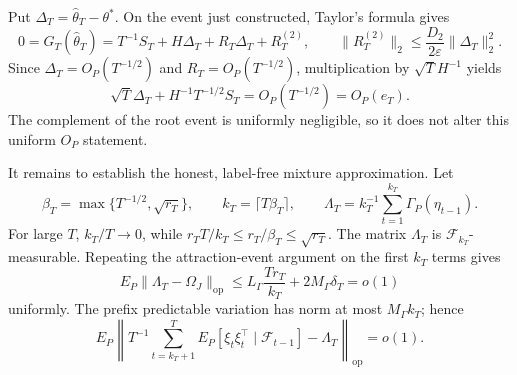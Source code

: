 Put \(\Delta_T=\widehat\theta_T-\theta^*\). On the event just constructed, Taylor's formula gives
\[
 0=G_T(\widehat\theta_T)
   =T^{-1}S_T+H\Delta_T+R_T\Delta_T+R_T^{(2)},
 \qquad
 \|R_T^{(2)}\|_2\le\frac{D_2}{2\varepsilon}\|\Delta_T\|_2^2.
\]
Since \(\Delta_T=O_P(T^{-1/2})\) and \(R_T=O_P(T^{-1/2})\), multiplication by \(\sqrt T H^{-1}\) yields
\[
 \sqrt T\Delta_T+H^{-1}T^{-1/2}S_T=O_P(T^{-1/2})=O_P(e_T).
\]
The complement of the root event is uniformly negligible, so it does not alter this uniform \(O_P\) statement.

It remains to establish the honest, label-free mixture approximation. Let
\[
 \beta_T=\max\{T^{-1/2},\sqrt{r_T}\},\qquad
 k_T=\lceil T\beta_T\rceil,
 \qquad
 \Lambda_T=k_T^{-1}\sum_{t=1}^{k_T}\Gamma_P(\eta_{t-1}).
\]
For large \(T\), \(k_T/T\to0\), while \(r_TT/k_T\le r_T/\beta_T\le\sqrt{r_T}\). The matrix \(\Lambda_T\) is \(\mathcal F_{k_T}\)-measurable. Repeating the attraction-event argument on the first \(k_T\) terms gives
\[
 E_P\|\Lambda_T-\Omega_J\|_{\mathrm{op}}
 \le L_\Gamma\frac{Tr_T}{k_T}+2M_\Gamma\delta_T=o(1)
\]
uniformly. The prefix predictable variation has norm at most \(M_\Gamma k_T\); hence
\[
 E_P\left\|T^{-1}\sum_{t=k_T+1}^T
 E_P[\xi_t\xi_t^\top\mid\mathcal F_{t-1}]-\Lambda_T\right\|_{\mathrm{op}}=o(1).
\]

